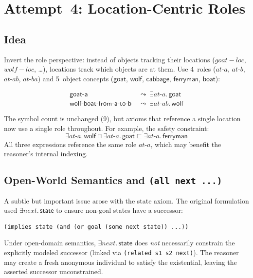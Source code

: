 \documentclass[11pt,a4paper]{article}
\newcommand{\DLsome}[2]{\exists #1.\,#2}
\newcommand{\DLand}{\sqcap}
\newcommand{\DLsub}{\sqsubseteq}
\newcommand{\concept}[1]{\ensuremath{\mathsf{#1}}}
\newcommand{\role}[1]{\ensuremath{\mathit{#1}}}
\begin{document}
\section{Attempt~4: Location-Centric Roles}
\label{sec:attempt4}

\subsection{Idea}

Invert the role perspective: instead of objects tracking their locations
(\role{goat-loc}, \role{wolf-loc}, \ldots), locations track which
objects are at them.  Use 4~roles (\role{at\text{-}a},
\role{at\text{-}b}, \role{at\text{-}ab}, \role{at\text{-}ba}) and
5~object concepts (\concept{goat}, \concept{wolf}, \concept{cabbage},
\concept{ferryman}, \concept{boat}):

\begin{align*}
\concept{goat\text{-}a} &\;\leadsto\; \DLsome{\role{at\text{-}a}}{\concept{goat}} \\
\concept{wolf\text{-}boat\text{-}from\text{-}a\text{-}to\text{-}b} &\;\leadsto\; \DLsome{\role{at\text{-}ab}}{\concept{wolf}}
\end{align*}

The symbol count is unchanged (9), but axioms that reference a single
location now use a single role throughout.  For example, the safety
constraint:
\[
\DLsome{\role{at\text{-}a}}{\concept{wolf}} \DLand
\DLsome{\role{at\text{-}a}}{\concept{goat}} \DLsub
\DLsome{\role{at\text{-}a}}{\concept{ferryman}}
\]
All three expressions reference the same role \role{at\text{-}a}, which
may benefit the reasoner's internal indexing.

\subsection{Open-World Semantics and \texttt{(all next ...)}}

A subtle but important issue arose with the state axiom.  The original
formulation used $\DLsome{\role{next}}{\concept{state}}$ to ensure
non-goal states have a successor:
\begin{lstlisting}[style=racer]
(implies state (and (or goal (some next state)) ...))
\end{lstlisting}

Under open-domain semantics, $\DLsome{\role{next}}{\concept{state}}$
does \emph{not} necessarily constrain the explicitly modeled successor
(linked via \texttt{(related s1 s2 next)}).  The reasoner may create a
fresh anonymous individual to satisfy the existential, leaving the
asserted successor unconstrained.
\end{document}
